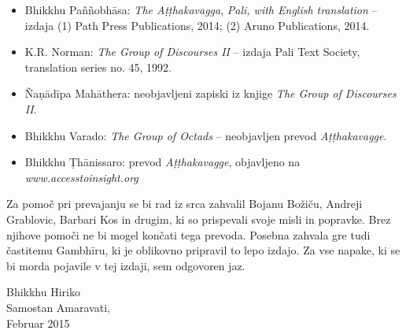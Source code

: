 \begin{itemize}
\item
  Bhikkhu Paññobhāsa: \emph{The Aṭṭhakavagga}, \emph{Pali, with English
  translation} -- izdaja (1) Path Press Publications, 2014; (2) Aruno
  Publications, 2014.
\item
  K.R. Norman: \emph{The Group of Discourses II} -- izdaja Pali Text
  Society, translation series no. 45, 1992.
\item
  Ñaṇādīpa Mahāthera: neobjavljeni zapiski iz knjige \emph{The Group of
  Discourses II}.
\item
  Bhikkhu Varado: \emph{The Group of Octads} -- neobjavljen prevod
  \emph{Aṭṭhakavagge}.
\item
  Bhikkhu Ṭhānissaro: prevod \emph{Aṭṭhakavagge}, objavljeno na \emph{www.accesstoinsight.org}
\end{itemize}

Za pomoč pri prevajanju se bi rad iz srca zahvalil Bojanu Božiču,
Andreji Grablovic, Barbari Kos in drugim, ki so prispevali svoje misli
in popravke. Brez njihove pomoči ne bi mogel končati tega prevoda.
Posebna zahvala gre tudi častitemu Gambhīru, ki je oblikovno pripravil
to lepo izdajo. Za vse napake, ki se bi morda pojavile v tej izdaji, sem
odgovoren jaz.

\bigskip

{\raggedleft
Bhikkhu Hiriko\\
Samostan Amaravati,\\
Februar 2015
\par}
